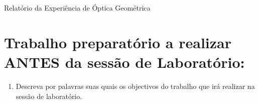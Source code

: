 \documentclass[a4paper,12pt]{article}  %
\author{Prof. Bernardo B. Carvalho}
\date{ Setembro 2015}
\newcommand{\HRule}{\rule{\linewidth}{0.5mm}}
\begin{document}
 



{  \sf  Relatório da Experiência de Óptica Geométrica} %



\section{\sf Trabalho preparatório a realizar  ANTES da sessão de Laboratório:}
\begin{enumerate}
\item Descreva por palavras suas quais os objectivos do trabalho que irá realizar na sessão de laboratório.

\end{enumerate}
\end{document}

